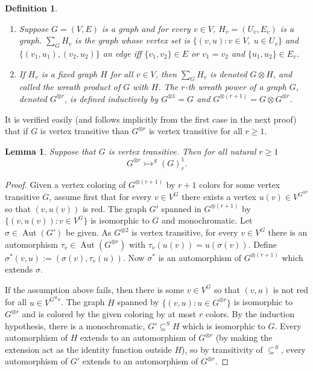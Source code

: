 \documentclass[11pt]{amsart}
\newcommand{\ars}{\rightarrowtail}
\newcommand{\su}{\subseteq}
\newcommand{\aut}{\operatorname{Aut}}
\newtheorem{lemma}[theorem]{Lemma}
\newtheorem{definition}[theorem]{Definition}
\begin{document}
\begin{definition}
\begin{enumerate}
\item Suppose $G=( V,E)$ is a graph and for every $v\in V$,
  $H_v=(U_v,E_v)$ is a graph. $\sum_G H_v$ is the graph whose
  vertex set is $\{(v,u):v\in V,\; u\in U_v\}$ and
  $\{(v_1,u_1),(v_2,u_2)\}$ an edge iff $\{v_1,v_2\}\in E$ or
  $v_1=v_2$ and $\{u_1,u_2\}\in E_v$.
\item If $H_v$ is a fixed graph $H$ for all $v\in V$, then $\sum_G H_v$
  is denoted $G\otimes H$, and called the \emph{wreath product} of $G$
  with $H$. The \emph{$r$-th wreath power} of a graph $G$, denoted
  $G^{\otimes r}$, is defined inductively by $G^{\otimes 1}=G$ and
  $G^{\otimes (r+1)}=G\otimes G^{\otimes r}$.
\end{enumerate}
\end{definition}

It is verified easily (and follows  implicitly from the first case in the
next proof) that if $G$ is vertex transitive than
$G^{\otimes r}$ is vertex transitive for all $r\ge 1$. 

\begin{lemma} \label{otimes} Suppose that $G$ is vertex transitive. Then
 for all natural $r\ge 1$
\[G^{\otimes r}\ars ^S (G)^1_r.\]
\end{lemma}
\begin{proof}
  Given a vertex coloring of $G^{\otimes (r+1)}$ by $r+1$ colors for
  some vertex transitive $G$, assume first that for every $v\in V^G$
  there exists a vertex $u(v)\in V^{G^{\otimes r}}$ so that $(v,u(v))$
  is red. The graph $G'$ spanned in $G^{\otimes (r+1)}$ by
  $\{(v,u(v)):v\in V^G\}$ is isomorphic to $G$ and monochromatic. Let
  $\sigma\in \aut(G')$ be given. As $G^{\otimes 2}$ is vertex
  transitive, for every $v\in V^G$ there is an automorphism $\tau_v\in
  \aut(G^{\otimes r})$ with $\tau_v(u(v))=u(\sigma(v))$. Define
  $\sigma^*(v,u):=(\sigma(v), \tau_v(u))$. Now $\sigma^*$ is an
  automorphism of $G^{\otimes(r+1)}$ which extends $\sigma$.

  If the assumption above fails, then there is some $v\in V^G$ so that
  $(v,u)$ is not red for all $u\in V^{G^\otimes r}$. The graph $H$
  spanned by $\{(v,u):u\in G^{\otimes r}\}$ is isomorphic to
  $G^{\otimes r}$ and is colored by the given coloring by at most $r$
  colors. By the induction hypothesis, there is a monochromatic,
  $G'\su^S H$ which is isomorphic to $G$. Every automorphism of $H$
  extends to an automorphism of $G^{\otimes r}$ (by making the
  extension act as the identity function outside $H$), so by
  transitivity of $\su^S$, every automorphism of $G'$ extends to an
  automorphism of $G^{\otimes r}$.
\end{proof}
\end{document}
